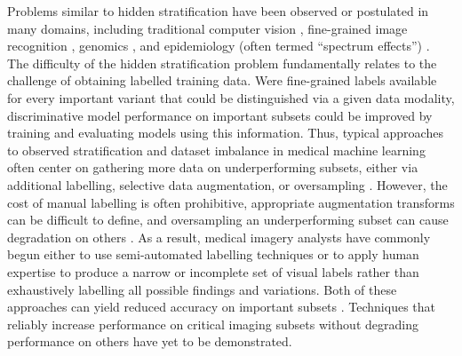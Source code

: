 \documentclass[sigconf]{acmart}
\begin{document}
Problems similar to hidden stratification have been observed or postulated in many domains, including traditional computer vision \citep{recht2018cifar}, fine-grained image recognition \citep{yao2011combining}, genomics \citep{cardon2003population}, and epidemiology (often termed ``spectrum effects'') \citep{mulherin2002spectrum}.
The difficulty of the hidden stratification problem fundamentally relates to the challenge of obtaining labelled training data.  
Were fine-grained labels available for every important variant that could be distinguished via a given data modality, discriminative model performance on important subsets could be improved by training and evaluating models using this information.  
Thus, typical approaches to observed stratification and dataset imbalance in medical machine learning often center on gathering more data on underperforming subsets, either via additional labelling, selective data augmentation, or oversampling \citep{Mazurowski2008-cq}.  
However, the cost of manual labelling is often prohibitive, appropriate augmentation transforms can be difficult to define, and oversampling an underperforming subset can cause degradation on others \citep{Fries2019-ze, Ratner2017-td, Buda2018-ab, Zech2018-xq}.  
As a result, medical imagery analysts have commonly begun either to use semi-automated labelling techniques \citep{Wang2017-vm, Fries2019-ze, Irvin2019-ho, Dunnmon2019-zw} or to apply human expertise to produce a narrow or incomplete set of visual labels \citep{Rajpurkar2017-rc} rather than exhaustively labelling all possible findings and variations.
Both of these approaches can yield reduced accuracy on important subsets \citep{Oakden-Rayner2019-yi}.  
Techniques that reliably increase performance on critical imaging subsets without degrading performance on others have yet to be demonstrated.
 
\end{document}
